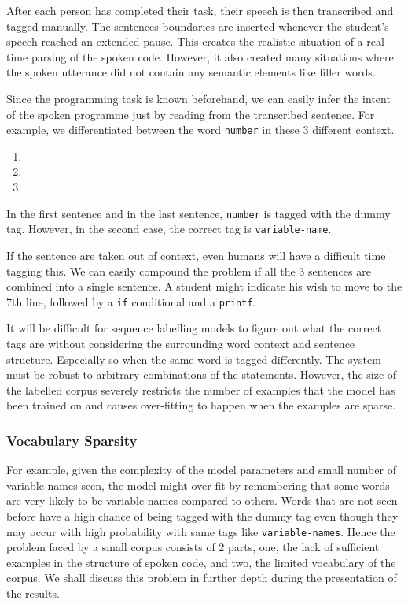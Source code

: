 \documentclass[fyp]{socreport}
\begin{document}
After each person has completed their task, their speech is then transcribed
and tagged manually. The sentences boundaries are inserted whenever the student's
speech reached an extended pause. This creates the realistic situation of
a real-time parsing of the spoken code. However, it also created many situations
where the spoken utterance did not contain any semantic elements like filler
words.

Since the programming task is known beforehand, we can easily infer the intent
of the spoken programme just by reading from the transcribed sentence. For example,
we differentiated between the word \texttt{number} in these 3 different context.

\begin{enumerate}
\itemsep0em
  \item {}    
  \item {}   
      
  \item {}    
\end{enumerate}

In the first sentence and in the last sentence, \texttt{number} is tagged
with the dummy tag. However, in the second case, the correct tag is
\texttt{variable-name}.

If the sentence are taken out of context, even humans will have a difficult
time tagging this.  We can easily compound the problem if all the 3 sentences
are combined into a single sentence. A student might indicate his wish to move
to the 7th line, followed by a \texttt{if} conditional and a \texttt{printf}.

It will be difficult for sequence labelling models to figure out what the
correct tags are without considering the surrounding word context and sentence
structure. Especially so when the same word is tagged differently. The system
must be robust to arbitrary combinations of the statements. However, the size
of the labelled corpus severely restricts the number of examples that the model
has been trained on and causes over-fitting to happen when the examples are
sparse.

\subsubsection{Vocabulary Sparsity} For example, given the complexity of the
model parameters and small number of variable names seen, the model might
over-fit by remembering that some words are very likely to be variable names
compared to others. Words that are not seen before have a high chance of being
tagged with the dummy tag even though they may occur with high probability with
same tags like \texttt{variable-names}. Hence the problem faced by a small
corpus consists of 2 parts, one, the lack of sufficient examples in the
structure of spoken code, and two, the limited vocabulary of the corpus.  We
shall discuss this problem in further depth during the presentation of the
results.
\end{document}
